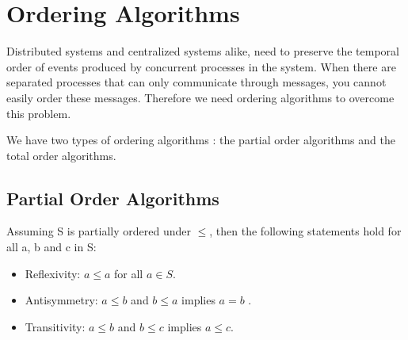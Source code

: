 \section{Ordering Algorithms}
\label{sec:ordering}
Distributed systems and centralized systems alike, need to preserve the temporal order of events produced by concurrent processes in the system. When there are separated processes that can only communicate through messages, you cannot easily order these messages.
Therefore we need ordering algorithms to overcome this problem.
\par
We have two types of ordering algorithms \autocite{lamport1978time}: the partial order algorithms and the total order algorithms.
\subsection{Partial Order Algorithms}
Assuming S is partially ordered under $\leq$, then the following statements hold for all a, b and c in S:
\begin{itemize}
	\item Reflexivity: $a \leq a$ for all $a \in S$.
	\item Antisymmetry: $a \leq b$ and $b \leq a$ implies $a=b$ .
	\item Transitivity: $a \leq b$  and $b \leq c$  implies $a \leq c$.
\end{itemize}

